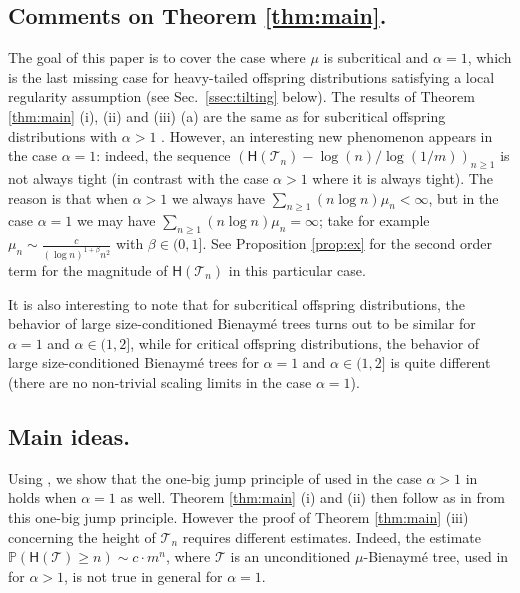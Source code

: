 \documentclass[a4paper,11pt]{article}
\DeclareRobustCommand{\P}{\mathbb{P}}
\begin{document}
        
 \subsection{Comments on Theorem \ref{thm:main}.}   The goal of this paper is to cover the case where $\mu$ is subcritical and $\alpha=1$, which is the last missing case for heavy-tailed offspring distributions satisfying a local regularity assumption (see Sec.~\ref{ssec:tilting} below). The results of Theorem \ref{thm:main} (i), (ii) and (iii) (a) are the same as for subcritical offspring distributions with $\alpha>1$ \cite{Kortchemski_2013}. However, an interesting new phenomenon appears in the case $\alpha=1$: indeed, the sequence $ \left({\mathsf{H}(\mathcal{T}_n)}- {\log(n)}/{\log(1/m)} \right)_{n \geq 1}$ is not always tight (in contrast with the case $\alpha>1$ where it is always tight). The reason is that when $\alpha>1$ we always have $\sum_{n \geq 1} (n \log n) \mu_{n}  <\infty$, but in the case $\alpha=1$ we may have $\sum_{n \geq 1} (n \log n) \mu_n = \infty$; take for example $\mu_{n} \sim \frac{c}{(\log n)^{1 + \beta} n^{2}}$ with $\beta \in (0,1]$. See Proposition \ref{prop:ex} for the second order term for the magnitude of ${\mathsf{H}(\mathcal{T}_n)}$ in this particular case.

        
 It is also interesting to note that for subcritical offspring distributions, the behavior of large size-conditioned Bienaymé trees turns out to be similar for $\alpha=1$ and $\alpha \in (1,2]$, while for critical offspring distributions, the behavior of large size-conditioned Bienaymé trees for $\alpha=1$ and $\alpha \in (1,2]$ is quite different (there are no non-trivial scaling limits in the  case $\alpha=1$). 
    
   \subsection{Main ideas.} Using \cite{Ber17}, we show that the one-big jump principle of  \cite{AL11} used in the case $\alpha>1$ in \cite{Kortchemski_2013} holds when $\alpha=1$ as well. Theorem \ref{thm:main} (i) and (ii) then follow as in  \cite{Kortchemski_2013} from this one-big jump principle. However the proof of Theorem \ref{thm:main} (iii) concerning the height of $ \mathcal{T}_{n}$ requires different estimates. Indeed, the estimate $\P( \mathsf{H}( \mathcal{T}) \geq n) \sim c \cdot m^{n}$, where $ \mathcal{T}$ is an unconditioned $\mu$-Bienaymé tree,  used in    \cite{Kortchemski_2013}  for $\alpha>1$, is not true in general for $\alpha=1$.
   
\end{document}
